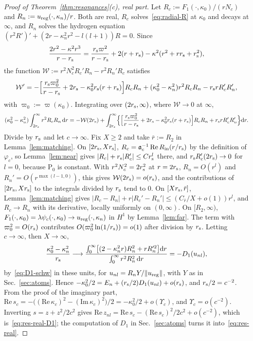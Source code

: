 \documentclass[%
 aip,
 jmp,
 amsmath,amssymb,
 reprint, onecolumn
]{revtex4-1}
\theoremstyle{definition}
\theoremstyle{remark}
\newcommand{\rmd}{\mathrm{d}}
\begin{document}
\begin{proof}[Proof of Theorem~\ref{thm:resonances}(c), real part]
Let $R_c:=F_1(\cdot,\kappa_0)/(rN_c)$ and
$R_n:=u_{\rm reg}(\cdot,\kappa_n)/r$. Both are real, $R_c$
solves~\eqref{eq:radial-R} at $\kappa_0$ and decays at $\infty$, and $R_n$
solves the hydrogen equation $(r^2R')'+(2r-\kappa_n^2r^2-l(l+1))R=0$. Since
\[
\frac{2r^2-\kappa^2r^3}{r-r_{\rm s}}=\frac{r_{\rm s}\varpi^2}{r-r_{\rm s}}
+2(r+r_{\rm s})-\kappa^2(r^2+rr_{\rm s}+r_{\rm s}^2),
\]
the function $\mathcal W:=r^2N_c^2R_c'R_n-r^2R_n'R_c$ satisfies
\[
\mathcal W'=-\Bigl[\frac{r_{\rm s}\varpi_0^2}{r-r_{\rm s}}+2r_{\rm s}
-\kappa_0^2r_{\rm s}(r+r_{\rm s})\Bigr]R_cR_n+(\kappa_0^2-\kappa_n^2)
r^2R_cR_n-r_{\rm s}rR_c'R_n',
\]
with $\varpi_0:=\varpi(\kappa_0)$. Integrating over $(2r_{\rm s},\infty)$,
where $\mathcal W\to0$ at $\infty$,
\begin{equation}\label{eq:real-identity}
(\kappa_0^2-\kappa_n^2)\int_{2r_{\rm s}}^\infty r^2R_cR_n\,\rmd r=
-\mathcal W(2r_{\rm s})+\int_{2r_{\rm s}}^\infty\Bigl\{\Bigl[
\frac{r_{\rm s}\varpi_0^2}{r-r_{\rm s}}+2r_{\rm s}-\kappa_0^2r_{\rm s}
(r+r_{\rm s})\Bigr]R_cR_n+r_{\rm s}rR_c'R_n'\Bigr\}\rmd r .
\end{equation}
Divide by $r_{\rm s}$ and let $c\to\infty$. Fix $X\geq2$ and take
$\bar r:=R_2$ in Lemma~\ref{lem:matching}. On
$[2r_{\rm s},Xr_{\rm s}]$,
$R_c=\mathfrak a_c^{-1}\,\mathrm{Re}\,R_{\rm in}(r/r_{\rm s})$ by the definition
of $\varphi_c$, so Lemma~\ref{lem:near} gives
$|R_c|+r_{\rm s}|R_c'|\leq Cr_{\rm s}^l$ there, and
$r_{\rm s}R_c'(2r_{\rm s})\to0$ for $l=0$, because $\mathrm P_0$ is
constant. With $r^2N_c^2=2r_{\rm s}^2$ at $r=2r_{\rm s}$, $R_n=O(r^l)$ and
$R_n'=O(r^{\max(l-1,0)})$, this gives $\mathcal W(2r_{\rm s})=o(r_{\rm s})$, and
the contributions of $[2r_{\rm s},Xr_{\rm s}]$ to the integrals divided
by $r_{\rm s}$ tend to $0$. On $[Xr_{\rm s},\bar r]$,
Lemma~\ref{lem:matching} gives $|R_c-R_n|+r|R_c'-R_n'|\leq(C_{\bar r}/X+
o(1))r^l$, and $R_c\to R_n$ with its derivative, locally uniformly on
$(0,\infty)$. On $[R_2,\infty)$, $F_1(\cdot,\kappa_0)=\lambda\psi_c(\cdot,
\kappa_0)\to u_{\rm reg}(\cdot,\kappa_n)$ in $H^1$ by
Lemma~\ref{lem:far}. The term with $\varpi_0^2=O(r_{\rm s})$ contributes
$O(\varpi_0^2\ln(1/r_{\rm s}))=o(1)$ after division by $r_{\rm s}$.
Letting $c\to\infty$, then $X\to\infty$,
\[
\frac{\kappa_0^2-\kappa_n^2}{r_{\rm s}}\longrightarrow
\frac{\int_0^\infty\bigl[(2-\kappa_n^2r)R_n^2+rR_n'^2\bigr]\rmd r}
{\int_0^\infty r^2R_n^2\,\rmd r}=-D_1(u_{nl}),
\]
by~\eqref{eq:D1-schw} in these units, for $u_{nl}=R_nY/\|u_{\rm reg}\|$,
with $Y$ as in Sec.~\ref{sec:atoms}. Hence $-\kappa_0^2/2=E_n+(r_{\rm
s}/2)D_1(u_{nl})+o(r_{\rm s})$, and $r_{\rm s}/2=c^{-2}$. From the proof of
the imaginary part, $\mathrm{Re}\,s_c=-\bigl((\mathrm{Re}\,\kappa_c)^2-
(\mathrm{Im}\,\kappa_c)^2\bigr)/2=-\kappa_0^2/2+o(\Upsilon_c)$, and
$\Upsilon_c=o(c^{-2})$. Inverting $s=z+z^2/2c^2$ gives
$\mathrm{Re}\,z_{nl}=\mathrm{Re}\,s_c-(\mathrm{Re}\,s_c)^2/2c^2+
o(c^{-2})$, which is~\eqref{eq:res-real-D1}; the computation of $D_1$ in
Sec.~\ref{sec:atoms} turns it into~\eqref{eq:res-real}.
\end{proof}
\end{document}
